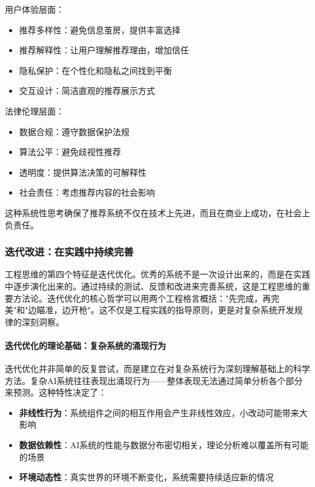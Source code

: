 用户体验层面：
\begin{itemize}
\item 推荐多样性：避免信息茧房，提供丰富选择
\item 推荐解释性：让用户理解推荐理由，增加信任
\item 隐私保护：在个性化和隐私之间找到平衡
\item 交互设计：简洁直观的推荐展示方式
\end{itemize}

法律伦理层面：
\begin{itemize}
\item 数据合规：遵守数据保护法规
\item 算法公平：避免歧视性推荐
\item 透明度：提供算法决策的可解释性
\item 社会责任：考虑推荐内容的社会影响
\end{itemize}

这种系统性思考确保了推荐系统不仅在技术上先进，而且在商业上成功，在社会上负责任。

\subsubsection{迭代改进：在实践中持续完善}

工程思维的第四个特征是迭代优化。优秀的系统不是一次设计出来的，而是在实践中逐步演化出来的。通过持续的测试、反馈和改进来完善系统，这是工程思维的重要方法论。迭代优化的核心哲学可以用两个工程格言概括："先完成，再完美"和"边瞄准，边开枪"。这不仅是工程实践的指导原则，更是对复杂系统开发规律的深刻洞察。

\paragraph{迭代优化的理论基础：复杂系统的涌现行为}
迭代优化并非简单的反复尝试，而是建立在对复杂系统行为深刻理解基础上的科学方法。复杂AI系统往往表现出涌现行为——整体表现无法通过简单分析各个部分来预测。这种特性决定了：

\begin{itemize}
\item \textbf{非线性行为}：系统组件之间的相互作用会产生非线性效应，小改动可能带来大影响
\item \textbf{数据依赖性}：AI系统的性能与数据分布密切相关，理论分析难以覆盖所有可能的场景
\item \textbf{环境动态性}：真实世界的环境不断变化，系统需要持续适应新的情况
\end{itemize}

